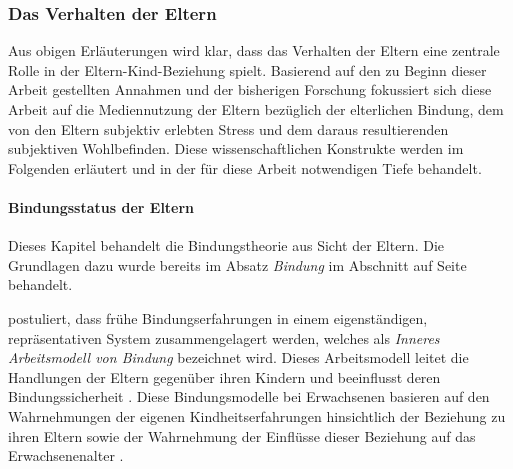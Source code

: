 \subsubsection{Das Verhalten der Eltern}\label{sec:Medienverhalten}
Aus obigen Erläuterungen wird klar, dass das Verhalten der Eltern eine zentrale Rolle in der Eltern-Kind-Beziehung spielt. Basierend auf den zu Beginn dieser Arbeit gestellten Annahmen und der bisherigen Forschung fokussiert sich diese Arbeit auf die Mediennutzung der Eltern bezüglich der elterlichen Bindung, dem von den Eltern subjektiv erlebten Stress und dem daraus resultierenden subjektiven Wohlbefinden. Diese wissenschaftlichen Konstrukte werden im Folgenden erläutert und in der für diese Arbeit notwendigen Tiefe behandelt.

\paragraph{Bindungsstatus der Eltern}\label{sec:Bindungsstatus}
Dieses Kapitel behandelt die Bindungstheorie aus Sicht der Eltern. Die Grundlagen dazu wurde bereits im Absatz \textit{Bindung} im Abschnitt \textit{} auf Seite \pageref{sec:Entwicklungsaufgaben} behandelt.

 postuliert, dass frühe Bindungserfahrungen in einem eigenständigen, repräsentativen System zusammengelagert werden, welches als \textit{Inneres Arbeitsmodell von Bindung} bezeichnet wird. Dieses Arbeitsmodell leitet die Handlungen der Eltern gegenüber ihren Kindern und beeinflusst deren Bindungssicherheit \cite{Siegler2008}. Diese Bindungsmodelle bei Erwachsenen basieren auf den Wahrnehmungen der eigenen Kindheitserfahrungen hinsichtlich der Beziehung zu ihren Eltern sowie der Wahrnehmung der Einflüsse dieser Beziehung auf das Erwachsenenalter \cite{Main1985}.

